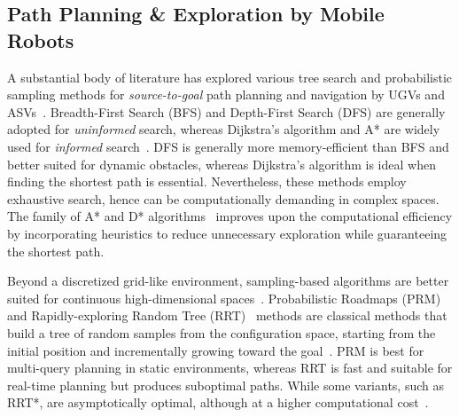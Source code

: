 \subsection{Path Planning \& Exploration by Mobile Robots}
A substantial body of literature has explored various tree search and probabilistic sampling methods for \textit{source-to-goal} path planning and navigation by UGVs and ASVs~\cite{liu2023path,sanchez2021path}. Breadth-First Search (BFS) and Depth-First Search (DFS) are generally adopted for \textit{uninformed} search, whereas Dijkstra's algorithm and A* are widely used for \textit{informed} search~\cite{cormen2022introduction}. DFS is generally more memory-efficient than BFS and better suited for dynamic obstacles, whereas Dijkstra’s algorithm is ideal when finding the shortest path is essential. Nevertheless, these methods employ exhaustive search, hence can be computationally demanding in complex spaces. The family of A* and D* algorithms~\cite{hart1968formal,ferguson2006using,al2011d} improves upon the computational efficiency by incorporating heuristics to reduce unnecessary exploration while guaranteeing the shortest path.

Beyond a discretized grid-like environment, sampling-based algorithms are better suited for continuous high-dimensional spaces~\cite{cormen2022introduction}. Probabilistic Roadmaps (PRM)~\cite{kavraki1998analysis} and Rapidly-exploring Random Tree (RRT)~\cite{li2021adaptive} methods are classical methods that build a tree of random samples from the configuration space, starting from the initial position and incrementally growing toward the goal~\cite{xu2024recent}. PRM is best for multi-query planning in static environments, whereas RRT is fast and suitable for real-time planning but produces suboptimal paths. While some variants, such as RRT*, are asymptotically optimal, although at a higher computational cost~\cite{shi2014spark}.


